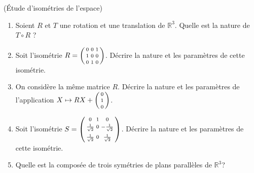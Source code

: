 \documentclass[a4paper,12pt,reqno]{amsart}
\begin{document}
\begin{exo} (Étude d'isométries de l'espace)
  \begin{enumerate}
    \item Soient $R$ et $T$ une rotation et une translation de $\mathbb{R}^{3}$. Quelle est la nature de $T \circ R$ ?
    \item Soit l'isométrie
      $R=
          \begin{psmallmatrix}
            0 & 0 & 1 \\[3pt]
            1 & 0 & 0 \\[3pt]
            0 & 1 & 0
          \end{psmallmatrix}
      $.
      Décrire la nature et les paramètres de cette isométrie.
      \item On considère la même matrice $R$. Décrire la nature et les paramètres de l'application
        $
          X \mapsto
          RX+
          \begin{psmallmatrix}
            0 \\[3pt]
            1 \\[3pt]
            0
          \end{psmallmatrix}
        $.
    \item Soit l'isométrie
      $S=
          \begin{psmallmatrix}
                    0         & 1 &         0          \\[3pt]
            \frac{1}{\sqrt{2}} & 0 & -\frac{1}{\sqrt{2}} \\[3pt]
            \frac{1}{\sqrt{2}} & 0 &  \frac{1}{\sqrt{2}}
          \end{psmallmatrix}
      $.
      Décrire la nature et les paramètres de cette isométrie.
    \item Quelle est la composée de trois symétries de plans parallèles de $\mathbb{R}^{3}$?
  \end{enumerate}
\end{exo}
\end{document}
